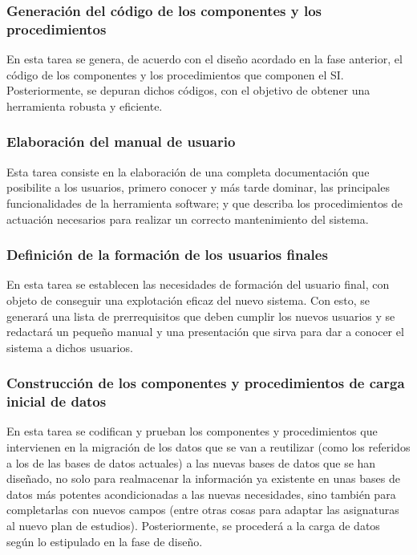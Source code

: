 \documentclass[11pt,a4paper,spanish,twoside]{book}
\begin{document}
\subsubsection{Generación del código de los componentes y los 
procedimientos}
En esta tarea se genera, de acuerdo con el diseño acordado en la fase 
anterior, el código de los componentes y los procedimientos que componen el SI.
Posteriormente, se depuran dichos códigos, con el objetivo de obtener una 
herramienta robusta y eficiente.

\subsubsection{Elaboración del manual de usuario}
Esta tarea consiste en la elaboración de una completa documentación que
posibilite a los usuarios, primero conocer y más tarde dominar, las principales
funcionalidades de la herramienta software; y que describa los procedimientos 
de actuación necesarios para realizar un correcto mantenimiento del sistema.

\subsubsection{Definición de la formación de los usuarios finales}
En esta tarea se establecen las necesidades de formación del usuario final, con
objeto de conseguir una explotación eficaz del nuevo sistema. Con esto, se 
generará una lista de prerrequisitos que deben cumplir los nuevos usuarios y 
se redactará un pequeño manual y una presentación que sirva para dar a conocer 
el sistema a dichos usuarios.

\subsubsection{Construcción de los componentes y procedimientos de carga
  inicial de datos}
En esta tarea se codifican y prueban los componentes y procedimientos que 
intervienen en la migración de los datos que se van a reutilizar (como los 
referidos a los de las bases de datos actuales) a las nuevas bases de datos 
que se han diseñado, no solo para realmacenar la información ya existente en
unas bases de datos más potentes acondicionadas a las nuevas necesidades, sino 
también para completarlas con nuevos campos (entre otras cosas para adaptar las
asignaturas al nuevo plan de estudios). Posteriormente, se procederá a la carga 
de datos según lo estipulado en la fase de diseño.
\end{document}
